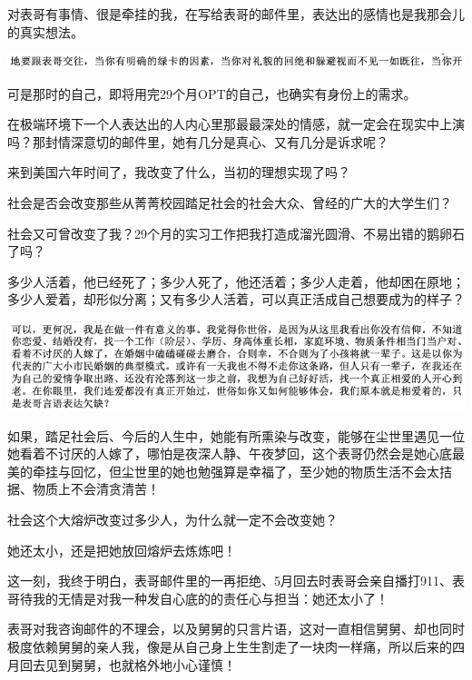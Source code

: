 \documentclass[9pt, b5paper]{article}
\begin{document}
对表哥有事情、很是牵挂的我，在写给表哥的邮件里，表达出的感情也是我那会儿的真实想法。

\begin{center}
\includegraphics[width=.9\linewidth]{./pic/backups_plans_20210415_124623.png}
\end{center}

可是那时的自己，即将用完29个月OPT的自己，也确实有身份上的需求。

在极端环境下一个人表达出的人内心里那最最深处的情感，就一定会在现实中上演吗？那封情深意切的邮件里，她有几分是真心、又有几分是诉求呢？

来到美国六年时间了，我改变了什么，当初的理想实现了吗？

社会是否会改变那些从菁菁校园踏足社会的社会大众、曾经的广大的大学生们？

社会又可曾改变了我？29个月的实习工作把我打造成溜光圆滑、不易出错的鹅卵石了吗？

多少人活着，他已经死了；多少人死了，他还活着；多少人走着，他却困在原地；多少人爱着，却形似分离；又有多少人活着，可以真正活成自己想要成为的样子？

\begin{center}
\includegraphics[width=.9\linewidth]{./pic/backups_plans_20210415_110528.png}
\end{center}

如果，踏足社会后、今后的人生中，她能有所熏染与改变，能够在尘世里遇见一位她看着不讨厌的人嫁了，哪怕是夜深人静、午夜梦回，这个表哥仍然会是她心底最美的牵挂与回忆，但尘世里的她也勉强算是幸福了，至少她的物质生活不会太拮据、物质上不会清贪清苦！

社会这个大熔炉改变过多少人，为什么就一定不会改变她？

她还太小，还是把她放回熔炉去炼炼吧！

这一刻，我终于明白，表哥邮件里的一再拒绝、5月回去时表哥会亲自播打911、表哥待我的无情是对我一种发自心底的的责任心与担当：她还太小了！

表哥对我咨询邮件的不理会，以及舅舅的只言片语，这对一直相信舅舅、却也同时极度依赖舅舅的亲人我，像是从自己身上生生割走了一块肉一样痛，所以后来的四月回去见到舅舅，也就格外地小心谨慎！
\end{document}
